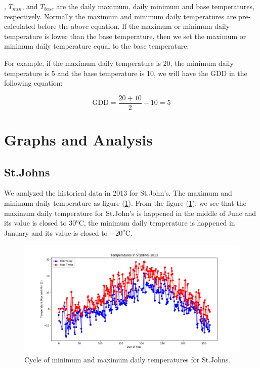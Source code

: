 \documentclass[12pt]{article}
\begin{document}
, {$T_{min}$}, and {$T_{base}$} are the daily maximum, daily minimum and base temperatures, respectively. Normally the maximum and minimum daily temperatures are pre-calculated before the above equation. If the maximum or minimum daily temperature is lower than the base temperature, then we set the maximum or minimum daily temperature equal to the base temperature.

For example, if the maximum daily temperature is 20, the minimum daily temperature is 5 and the base temperature is 10, we will have the GDD in the following equation:

\begin{equation}
\textrm{GDD} =\frac{20+10}{2}- 10=5
\end{equation}


\section{Graphs and Analysis}
\subsection{ \bf St.Johns }

We analyzed the historical data in 2013 for St.John's. The maximum and minimum daily temperature as figure (\ref{1}). From the figure (\ref{1}), we see that the maximum daily temperature for St.John's is happened in the middle of June and its value is closed to $30^{o}$C, the minimum daily temperature is happened in January and its value is closed to $-20^{o}$C.






\begin{figure}[H]
\begin{center}
\includegraphics[width=5.25in]{../Plot/STJOHNS/day_vs_temp_2013.png}

\caption{Cycle of minimum and maximum daily temperatures for St.Johns.}
\label{1}
\end{center}





\end{figure}
\end{document}
